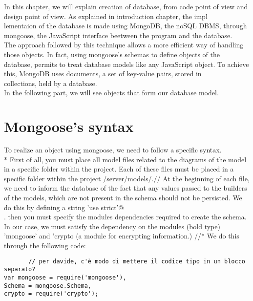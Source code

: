 
In this chapter, we will explain creation of database, from code point of view and design point of view. As explained in introduction chapter, the impl\\
lementaion of the database is made using MongoDB, the noSQL DBMS, through mongoose, the JavaScript interface beetween the program and the database.
\\
The approach followed by this technique allows a more efficient way of handling those objects. In fact, using mongoose's schemas to define objects of the\\
database, permits to treat database models like any JavaScript object. To achieve this, MongoDB uses documents, a set of key-value pairs, stored in \\
collections, held by a database. 
\\
In the following part, we will see objects that form our database model.

\section{Mongoose's syntax}
To realize an object using mongoose, we need to follow a specific syntax. \\* First of all, you must place all model files related to the diagrams of the model in a specific folder within the project. Each of these files must be placed in a specific folder within the project /server/models/.//
At the beginning of each file, we need to inform the database of the fact that any values ​​passed to the builders of the models, which are not present in the schema should not be persisted. We do this by defining a string \mbox{}\verb@ 'use strict'@\\.
then you must specify the modules dependencies required to create the schema. In our case, we must satisfy the dependency on the modules (bold type) 'mongoose' and 'crypto (a module for encrypting information.) //*   We do this through the following code: 
\begin{verbatim}       // per davide, c'è modo di mettere il codice tipo in un blocco separato?
var mongoose = require('mongoose'),
Schema = mongoose.Schema,
crypto = require('crypto');
\end{verbatim}

